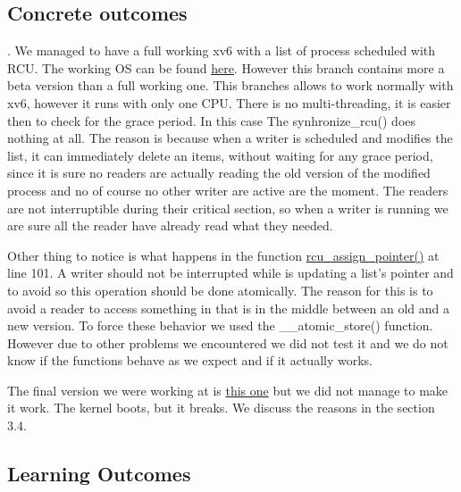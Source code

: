 \documentclass[10pt,a4]{article}
\begin{document}
\subsection{Concrete outcomes}
.
We managed to have a full working xv6 with a list of process scheduled with RCU. The working OS can be found \href{https://github.com/salvoM/xv6-riscv-rcu/tree/working_version}{here}. However this branch contains more a beta version than a full working one. This branches allows to work normally with xv6, however it runs with only one CPU. There is no multi-threading, it is easier then to check for the grace period. In this case The synhronize\_rcu() does nothing at all. The reason is because when a writer is scheduled and modifies the list, it can immediately delete an items, without waiting for any grace period, since it is sure no readers are actually reading the old version of the modified process and no of course no other writer are active are the moment. The readers are not interruptible during their critical section, so when a writer is running we are sure all the reader have already read what they needed.

Other thing to notice is what happens in the function \href{https://github.com/salvoM/xv6-riscv-rcu/blob/final/kernel/list_proc.c}{rcu\_assign\_pointer()} at line 101. A writer should not be interrupted while is updating a list's pointer and to avoid so this operation should be done atomically. The reason for this is to avoid a reader to access something in that is in the middle between an old and a new version. To force these behavior we used the \_\_atomic\_store() function. However due to other problems we encountered we did not test it and we do not know if the functions behave as we expect and if it actually works.


The final version we were working at is \href{https://github.com/salvoM/xv6-riscv-rcu/tree/definitive}{this one} but we did not manage to make it work. The kernel boots, but it breaks. We discuss the reasons in the section 3.4.


\subsection{Learning Outcomes}
\end{document}
